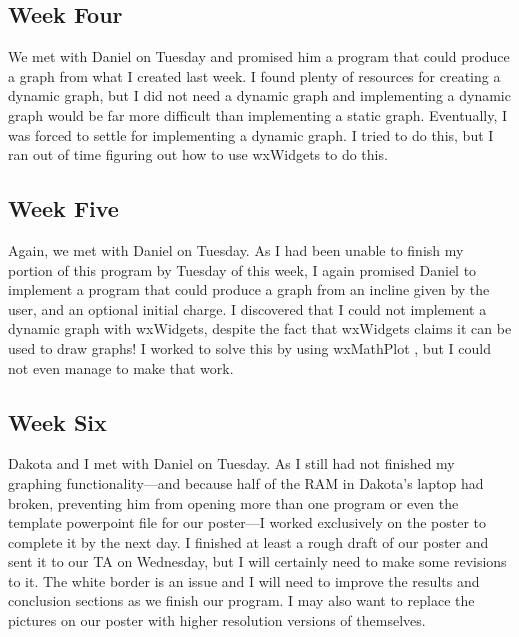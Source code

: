\begin{singlespace}
\subsection{Week Four}
We met with Daniel on Tuesday and promised him a program that could produce a graph from what I created last week.
I found plenty of resources for creating a dynamic graph, but I did not need a dynamic graph and implementing a dynamic graph would be far more difficult than implementing a static graph.
Eventually, I was forced to settle for implementing a dynamic graph.
I tried to do this, but I ran out of time figuring out how to use wxWidgets to do this.

\subsection{Week Five}
Again, we  met with Daniel on Tuesday.
As I had been unable to finish my portion of this program by Tuesday of this week, I again promised Daniel to implement a program that could produce a graph from an incline given by the user, and an optional initial charge.
I discovered that I could not implement a dynamic graph with wxWidgets, despite the fact that wxWidgets claims it can be used to draw graphs!
I worked to solve this by using wxMathPlot \cite{wxMathPlot}, but I could not even manage to make that work.

\subsection{Week Six}
Dakota and I met with Daniel on Tuesday.
As I still had not finished my graphing functionality---and because half of the RAM in Dakota's laptop had broken, preventing him from opening more than one program or even the template powerpoint file for our poster---I worked exclusively on the poster to complete it by the next day.
I finished at least a rough draft of our poster and sent it to our TA on Wednesday, but I will certainly need to make some revisions to it.
The white border is an issue and I will need to improve the results and conclusion sections as we finish our program.
I may also want to replace the pictures on our poster with higher resolution versions of themselves.


\end{singlespace}

